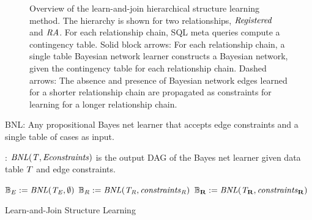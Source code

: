 \begin{figure}[htbp] %
 \centering
{} 
\caption{Overview of the learn-and-join hierarchical structure learning method. The hierarchy is shown for 
two relationships, $\it{Registered}$ and $\it{RA}$. For each relationship chain, SQL meta queries compute a contingency table. Solid block arrows: For each relationship chain, a single table Bayesian network learner constructs a Bayesian network, given the contingency table for each relationship chain. Dashed arrows: The absence and presence of Bayesian network edges learned for a shorter relationship chain are propagated as constraints for learning for a longer relationship chain.}
 \label{fig:lattice}
\end{figure}

\begin{algorithm}[htbp]
\Calls BNL: Any propositional Bayes net learner that accepts edge constraints and a single table of cases as input.
\begin{algorithmic}
\STATE \Notation: $\it{BNL}(T,\it{Econstraints})$ is the output DAG of the Bayes net learner given data table $T$ and edge constraints.
\end{algorithmic}
\begin{algorithmic}[1]
\STATE $\mathbb{B}_{E} := \it{BNL}(T_{E},\emptyset)$
\ENDFOR
{} 
 
 
\STATE $\mathbb{B}_{R} := \it{BNL}(T_{R},\it{constraints}_{R})$
\ENDFOR
{}
 
\STATE{$\dtable_{\set{\Relation}} := \cttable(\rnodes{\set{\Relation}}$} 
\STATE $\mathbb{B}_{\mathbf{R}} := \it{BNL}(T_{\mathbf{R}},\it{constraints}_{\mathbf{R}})$
\ENDFOR
\ENDFOR
\end{algorithmic}
\caption{Learn-and-Join Structure Learning}
\label{alg:laj-pseudocode}
\end{algorithm}


